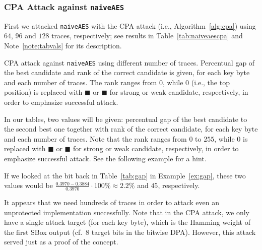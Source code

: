 \subsubsection{CPA Attack against {\tt naiveAES}}
	
	First we attacked {\tt naiveAES} with the CPA attack (i.e., Algorithm~\ref{alg:cpa}) using $64$, $96$ and $128$ traces, respectively; see results in Table~\ref{tab:naiveaescpa} and Note~\ref{note:tabvals} for its description.
	
	\newpage   %
	
	\begin{table}[h]
		\begin{center}
		
		\end{center}
	\caption{CPA attack against {\tt naiveAES} using different number of traces. Percentual gap of the best candidate and rank of the correct candidate is given, for each key byte and each number of traces. The rank ranges from $0$, while $0$ (i.e., the top position) is replaced with $\blacksquare$ or {\weak$\blacksquare$} for strong or weak candidate, respectively, in order to emphasize successful attack.}
	\label{tab:naiveaescpa}
	\end{table}
	
	\begin{note}
	\label{note:tabvals}
		In our tables, two values will be given: percentual gap of the best candidate to the second best one together with rank of the correct candidate, for each key byte and each number of traces. Note that the rank ranges from $0$ to $255$, while $0$ is replaced with $\blacksquare$ or {\weak$\blacksquare$} for strong or weak candidate, respectively, in order to emphasize successful attack. See the following example for a hint.
	\end{note}
	
	\begin{example}
	\label{ex:gaprank}
		If we looked at the  bit back in Table~\ref{tab:gap} in Example~\ref{ex:gap}, these two values would be $\frac{0.3970-0.3884}{0.3970}\cdot100\%\approx2.2\%$ and $45$, respectively.
	\end{example}
	
	It appears that we need hundreds of traces in order to attack even an unprotected implementation successfully. Note that in the CPA attack, we only have a single attack target (for each key byte), which is the Hamming weight of the first SBox output (cf.\ $8$ target bits in the bitwise DPA). However, this attack served just as a proof of the concept.
	
